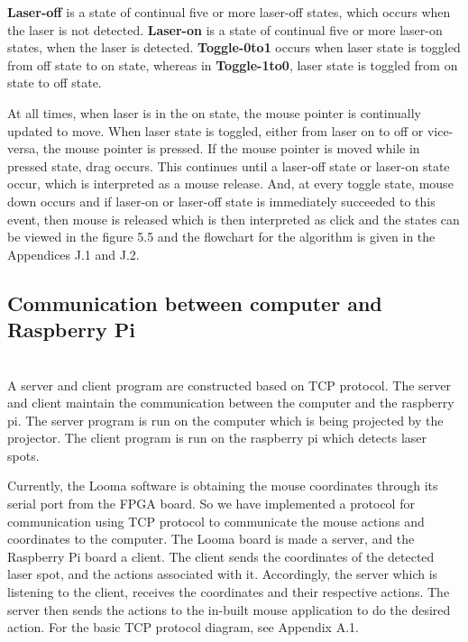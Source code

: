 \documentclass[12pt, a4paper]{article}
\begin{document}
{	\textbf {Laser-off} is a state of continual five or more laser-off  states, which occurs when the laser is not detected. \textbf{Laser-on} is a state of continual five or more laser-on states, when the laser is detected. \textbf{Toggle-0to1} occurs when laser state is toggled from off state to on state, whereas in \textbf{Toggle-1to0}, laser state is toggled from on state to off state. 
	
	At all times, when laser is in the on state, the mouse pointer is continually updated to move. When laser state is toggled, either from laser on to off or vice-versa, the mouse pointer is pressed. If the mouse pointer is moved while in pressed state, drag occurs. This continues until a laser-off state or laser-on state occur, which is interpreted as a mouse release. And, at every toggle state, mouse down occurs and if laser-on or laser-off state is immediately succeeded to this event, then mouse is released which is then interpreted as click and the states can be viewed in the figure 5.5 and the flowchart for the algorithm is given in the Appendices J.1 and J.2.
\newpage


\subsection{Communication between computer and Raspberry Pi}
~\\
	A server and client program are constructed based on TCP protocol. The server and client maintain the communication between the computer and the raspberry pi. The server program is run on the computer which is being projected by the projector. The client program is run on the raspberry pi which detects laser spots. 
	
	Currently, the Looma software is obtaining the mouse coordinates through its serial port from the FPGA board. So we have implemented a protocol for communication using TCP protocol to communicate the mouse actions and coordinates to the computer. The Looma board is made a server, and the Raspberry Pi board a client. The client sends the coordinates of the detected laser spot, and the actions associated with it. Accordingly, the server which is listening to the client, receives the coordinates and their respective actions. The server then sends the actions to the in-built mouse application to do the desired action.  For the basic TCP protocol diagram, see Appendix A.1.


}
\end{document}
